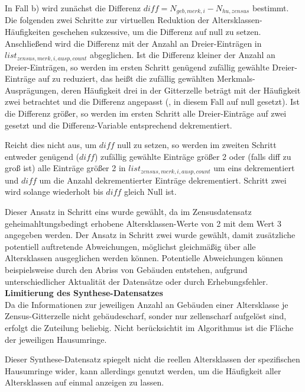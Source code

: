 			In Fall b) wird zunächst die Differenz $diff = N_{geb,merk,i} - N_{hu,zensus}$ bestimmt. Die folgenden zwei Schritte zur virtuellen Reduktion der Altersklassen-Häufigkeiten geschehen sukzessive, um die Differenz auf null zu setzen. Anschließend wird die Differenz mit der Anzahl an Dreier-Einträgen in $list_{zensus,merk,i,ausp,count}$ abgeglichen. Ist die Differenz kleiner der Anzahl an Dreier-Einträgen, so werden im ersten Schritt genügend zufällig gewählte Dreier-Einträge auf zu reduziert, das heißt die zufällig gewählten Merkmals-Ausprägungen, deren Häufigkeit drei in der Gitterzelle beträgt mit der Häufigkeit zwei betrachtet und die Differenz angepasst (, in diesem Fall auf null gesetzt). Ist die Differenz größer, so werden im ersten Schritt alle Dreier-Einträge auf zwei gesetzt und die Differenz-Variable entsprechend dekrementiert. 
			
			Reicht dies nicht aus, um $diff$ null zu setzen, so werden im zweiten Schritt entweder genügend ($diff$) zufällig gewählte Einträge größer 2 oder (falls diff zu groß ist) alle Einträge größer 2 in $list_{zensus,merk,i,ausp,count}$ um eins dekrementiert und $diff$ um die Anzahl dekrementierter Einträge dekrementiert. Schritt zwei wird solange wiederholt bis $diff$ gleich Null ist.
			
			Dieser Ansatz in Schritt eins wurde gewählt, da im Zensusdatensatz geheimahltungsbedingt erhobene Altersklassen-Werte von 2 mit dem Wert 3 angegeben werden. Der Ansatz in Schritt zwei wurde gewählt, damit zusätzliche potentiell auftretende Abweichungen, möglichst gleichmäßig über alle Altersklassen ausgeglichen werden können. Potentielle Abweichungen können beispielsweise durch den Abriss von Gebäuden entstehen, aufgrund unterschiedlicher Aktualität der Datensätze oder durch Erhebungsfehler.\\
			
			\textbf{Limitierung des Synthese-Datensatzes}\\
			Da die Informationen zur jeweiligen Anzahl an Gebäuden einer Altersklasse je Zensus-Gitterzelle nicht gebäudescharf, sonder nur zellenscharf aufgelöst sind, erfolgt die Zuteilung beliebig. Nicht berücksichtit im Algorithmus ist die Fläche der jeweiligen Hausumringe.
			
			Dieser Synthese-Datensatz spiegelt nicht die reellen Altersklassen der spezifischen Hausumringe wider, kann allerdings genutzt werden, um die Häufigkeit aller Altersklassen auf einmal anzeigen zu lassen. 
			
